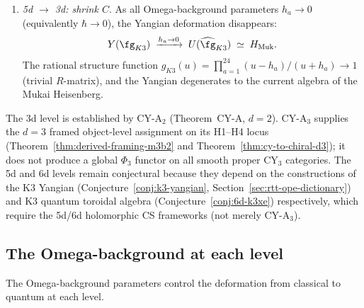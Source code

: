 \begin{conjecture}
\begin{enumerate}[label=\textup{(\roman*)}]
 \item \emph{5d $\to$ 3d: shrink $C$}. As all Omega-background parameters $h_a \to 0$ (equivalently $\hbar \to 0$), the Yangian deformation disappears:
 \[
 Y(\fg_{K3}) \;\xrightarrow{h_a \to 0}\; U(\widehat{\fg}_{K3}) \;\simeq\; H_{\mathrm{Muk}}.
 \]
 The rational structure function $g_{K3}(u) = \prod_{a=1}^{24} (u - h_a)/(u + h_a) \to 1$ (trivial $R$-matrix), and the Yangian degenerates to the current algebra of the Mukai Heisenberg.
\end{enumerate}
The 3d level is established by CY-A$_2$ (Theorem~CY-A, $d = 2$). CY-A$_3$ supplies the $d = 3$ framed object-level assignment on its H1--H4 locus (Theorem~\ref{thm:derived-framing-m3b2} and Theorem~\ref{thm:cy-to-chiral-d3}); it does not produce a global $\Phi_3$ functor on all smooth proper CY$_3$ categories. The 5d and 6d levels remain conjectural because they depend on the constructions of the K3 Yangian (Conjecture~\ref{conj:k3-yangian}, Section~\ref{sec:rtt-ope-dictionary}) and K3 quantum toroidal algebra (Conjecture~\ref{conj:6d-k3xe}) respectively, which require the 5d/6d holomorphic CS frameworks (not merely CY-A$_3$).
\end{conjecture}

\subsection{The Omega-background at each level}
\label{subsec:k3-omega-background}

The Omega-background parameters control the deformation from classical to quantum at each level.

